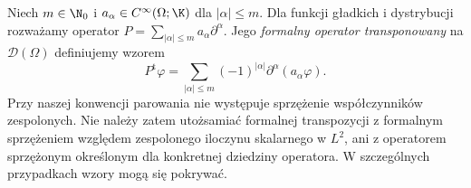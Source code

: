 \begin{definicja}
\label{def:formal-transpose20}
Niech $m\in\N_0$ i $a_\alpha\in C^\infty(\Omega;\K)$
dla $|\alpha|\le m$. Dla funkcji gładkich i dystrybucji
rozważamy operator $P=\sum_{|\alpha|\le m}a_\alpha\partial^\alpha$.
Jego \emph{formalny operator transponowany} na $\mathcal D(\Omega)$
definiujemy wzorem
\[
 P^{\mathrm t}\varphi=
 \sum_{|\alpha|\le m}(-1)^{|\alpha|}
 \partial^\alpha(a_\alpha\varphi).
\]
Przy naszej konwencji parowania nie występuje sprzężenie
współczynników zespolonych. Nie należy zatem utożsamiać
formalnej transpozycji z formalnym sprzężeniem względem
zespolonego iloczynu skalarnego w $L^2$, ani z operatorem
sprzężonym określonym dla konkretnej dziedziny operatora.
W szczególnych przypadkach wzory mogą się pokrywać.
\end{definicja}

